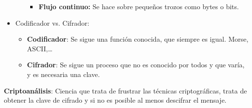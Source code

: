 \documentclass[12pt, twoside, openright]{report} %
\begin{document}
\begin{itemize}
\begin{itemize}
\begin{itemize}
			            \item \textbf{Flujo continuo:} Se hace sobre pequeños trozos como bytes o bits.
		            \end{itemize}
	      \end{itemize}
	      \pagebreak
	\item Codificador vs. Cifrador:
	      \begin{itemize}
		      \item \textbf{Codificador}: Se sigue una función conocida, que siempre es igual. Morse, ASCII,\ldots{}
		      \item \textbf{Cifrador}: Se sigue un proceso que no es conocido por todos y que varía, y es necesaria una clave.
	      \end{itemize}
\end{itemize}

\textbf{Criptoanálisis}: Ciencia que trata de frustrar las técnicas criptográficas, trata de obtener la clave de cifrado y si no es posible al menos descifrar el mensaje.
\end{document}
